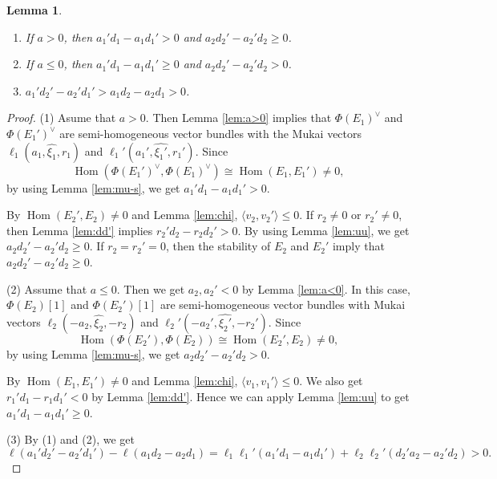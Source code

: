 \documentclass[10pt]{amsart}
\newcommand{\Hom}{\operatorname{Hom}}
\numberwithin{equation}{section}
\theoremstyle{plain}
\newtheorem{lem}[thm]{Lemma}
\theoremstyle{definition}
\theoremstyle{remark}
\begin{document}
\begin{lem}
\begin{enumerate}
\item[(1)]
If $a > 0$, then $a_1' d_1-a_1 d_1' > 0$ and $a_2 d_2'-a_2' d_2  \geq 0$.
\item[(2)]
If $a \leq 0$, then $a_1' d_1-a_1 d_1' \geq 0$ and
$a_2 d_2'-a_2' d_2 > 0$.
\item[(3)]
$a_1' d_2'-a_2' d_1' > a_1 d_2-a_2 d_1>0$.
\end{enumerate}
\end{lem}

\begin{proof}

(1) Asume that $a>0$.
Then Lemma \ref{lem:a>0} implies that
$\Phi(E_1)^{\vee}$ and $\Phi(E_1')^{\vee}$ are 
semi-homogeneous vector bundles 
with the Mukai vectors $\ell_1 (a_1,\widehat{\xi_1},r_1)$ and
$\ell_1' (a_1',\widehat{\xi_1'},r_1')$.
Since 
$$
\Hom(\Phi(E_1')^{\vee},\Phi(E_1)^{\vee}) \cong \Hom(E_1,E_1') \ne 0,
$$
by using Lemma \ref{lem:mu-s}, we get
$a_1' d_1-a_1 d_1' > 0$.

By $\Hom(E_2',E_2) \ne 0$ and Lemma \ref{lem:chi},
$\langle v_2,v_2' \rangle \leq 0$.
If $r_2 \ne 0$ or $r_2' \ne 0$, then 
Lemma \ref{lem:dd'} implies $r_2' d_2-r_2 d_2'>0$.
By using Lemma \ref{lem:uu}, we get 
$a_2 d_2'-a_2' d_2  \geq 0$.
If $r_2=r_2' =0$, then the stability of $E_2$ and $E_2'$ imply that
$a_2 d_2'-a_2' d_2 \geq 0$.

(2)
Assume that $a \leq 0$.
Then we get $a_2,a_2'<0$ by Lemma \ref{lem:a<0}.
In this case,
$\Phi(E_2)[1]$ and $\Phi(E_2')[1]$ are semi-homogeneous vector bundles
with Mukai vectors 
$\ell_2 (-a_2,\widehat{\xi_2},-r_2)$ and
$\ell_2' (-a_2',\widehat{\xi_2'},-r_2')$.
Since 
$$
\Hom(\Phi(E_2'),\Phi(E_2)) \cong \Hom(E_2',E_2) \ne 0,
$$
by using Lemma \ref{lem:mu-s}, we get
$a_2 d_2'-a_2' d_2 > 0$.

By $\Hom(E_1,E_1') \ne 0$ and Lemma \ref{lem:chi},
$\langle v_1,v_1' \rangle \leq 0$.
We also get $r_1' d_1-r_1 d_1'<0$ by
Lemma \ref{lem:dd'}.
Hence we can apply Lemma \ref{lem:uu} to get
$a_1' d_1-a_1 d_1'  \geq 0$.

(3) 
By (1) and (2), we get 
\begin{equation}\label{eq:area2}
\ell (a_1'd_2'-a_2' d_1')-\ell (a_1 d_2-a_2 d_1)=\ell_1 \ell_1' (a_1' d_1-a_1 d_1')+
\ell_2 \ell_2' (d_2' a_2-a_2' d_2)>0.
\end{equation}
\end{proof}


\end{document}
